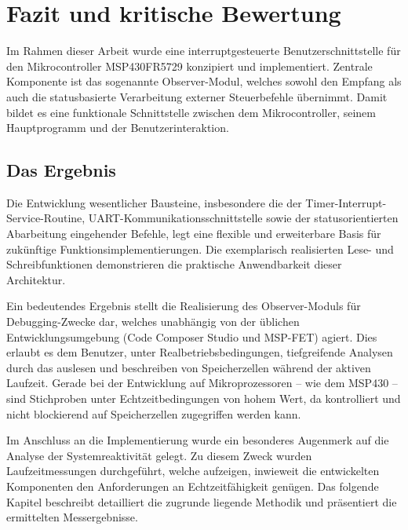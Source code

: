 

\chapter{Fazit und kritische Bewertung}
\label{cha:Fazit}

Im Rahmen dieser Arbeit wurde eine interruptgesteuerte Benutzerschnittstelle f\"ur den Mikrocontroller MSP430FR5729 konzipiert und implementiert. Zentrale Komponente ist das sogenannte Observer-Modul, welches sowohl den Empfang als auch die statusbasierte Verarbeitung externer Steuerbefehle \"ubernimmt. Damit bildet es eine funktionale Schnittstelle zwischen dem Mikrocontroller, seinem Hauptprogramm und der Benutzerinteraktion.


\section{Das Ergebnis}
\label{sec:Ergebnis}

Die Entwicklung wesentlicher Bausteine, insbesondere die der Timer-Interrupt-Service-Routine, UART-Kommunikationsschnittstelle sowie der statusorientierten Abarbeitung eingehender Befehle, legt eine flexible und erweiterbare Basis f\"ur zuk\"unftige Funktionsimplementierungen. Die exemplarisch realisierten Lese- und Schreibfunktionen demonstrieren die praktische Anwendbarkeit dieser Architektur.

Ein bedeutendes Ergebnis stellt die Realisierung des Observer-Moduls f\"ur Debugging-Zwecke dar, welches unabh\"angig von der \"ublichen Entwicklungsumgebung (Code Composer Studio und MSP-FET) agiert. Dies erlaubt es dem Benutzer, unter Realbetriebsbedingungen, tiefgreifende Analysen durch das auslesen und beschreiben von Speicherzellen w\"ahrend der aktiven Laufzeit. Gerade bei der Entwicklung auf Mikroprozessoren -- wie dem MSP430 -- sind Stichproben unter Echtzeitbedingungen von hohem Wert, da kontrolliert und nicht blockierend auf Speicherzellen zugegriffen werden kann.

\newpage
Im Anschluss an die Implementierung wurde ein besonderes Augenmerk auf die Analyse der Systemreaktivit\"at gelegt. Zu diesem Zweck wurden Laufzeitmessungen durchgef\"uhrt, welche aufzeigen, inwieweit die entwickelten Komponenten den Anforderungen an Echtzeitf\"ahigkeit gen\"ugen. Das folgende Kapitel beschreibt detailliert die zugrunde liegende Methodik und pr\"asentiert die ermittelten Messergebnisse.\AI


